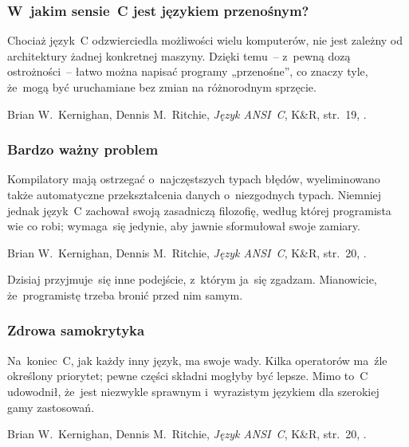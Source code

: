 \documentclass[10pt,t]{beamer}
\begin{document}
\begin{frame}
  \frametitle{W~jakim sensie~C jest językiem przenośnym?}


  Chociaż język~C odzwierciedla możliwości wielu komputerów, nie jest
  zależny od architektury żadnej konkretnej maszyny. Dzięki temu~--
  z~pewną dozą ostrożności~-- łatwo można napisać programy „przenośne”,
  co znaczy tyle, że~mogą być uruchamiane bez zmian na różnorodnym sprzęcie.

  Brian W.~Kernighan, Dennis M.~Ritchie, \textit{Język ANSI~C}, K\&R,
  str.~19, \parencite{Kernighan-Ritchie-Jezyk-ANSI-C-Pub-2004}.

\end{frame}





\begin{frame}
  \frametitle{Bardzo ważny problem}


  Kompilatory mają ostrzegać o~najczęstszych typach błędów, wyeliminowano
  także automatyczne przekształcenia danych o~niezgodnych typach.
  Niemniej jednak język~C zachował swoją zasadniczą filozofię, według
  której programista wie co robi; wymaga~się jedynie, aby jawnie sformułował
  swoje zamiary.

  Brian W.~Kernighan, Dennis M.~Ritchie, \textit{Język ANSI~C}, K\&R,
  str.~20, \parencite{Kernighan-Ritchie-Jezyk-ANSI-C-Pub-2004}.






  Dzisiaj przyjmuje~się inne podejście, z~którym ja~się zgadzam. Mianowicie,
  że~programistę \alert{trzeba} bronić przed nim samym.

\end{frame}





\begin{frame}
  \frametitle{Zdrowa samokrytyka}


  Na~koniec~C, jak każdy inny język, ma swoje wady. Kilka operatorów
  ma~źle określony priorytet; pewne części składni mogłyby być lepsze. Mimo
  to~C udowodnił, że~jest niezwykle sprawnym i~wyrazistym językiem dla
  szerokiej gamy zastosowań.

  Brian W.~Kernighan, Dennis M.~Ritchie, \textit{Język ANSI~C}, K\&R,
  str.~20, \parencite{Kernighan-Ritchie-Jezyk-ANSI-C-Pub-2004}.

\end{frame}
\end{document}
